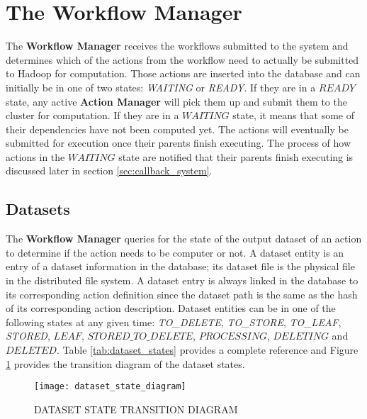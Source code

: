 \section{The Workflow Manager}
The \textbf{Workflow Manager} receives the workflows submitted to the system and determines which of the actions from the workflow need to actually be submitted to Hadoop for computation. Those actions are inserted into the database and can initially be in one of two states: \textit{WAITING} or \textit{READY}. If they are in a $READY$ state, any active \textbf{Action Manager} will pick them up and submit them to the cluster for computation. If they are in a $WAITING$ state, it means that some of their dependencies have not been computed yet. The actions will eventually be submitted for execution once their parents finish executing. The process of how actions in the $WAITING$ state are notified that their parents finish executing is discussed later in section \ref{sec:callback_system}.

\subsection{Datasets}
The \textbf{Workflow Manager} queries for the state of the output dataset of an action to determine if the action needs to be computer or not.  A dataset entity is an entry of a dataset information in the database; its dataset file is the physical file in the distributed file system. A dataset entry is always linked in the database to its corresponding action definition since the dataset path is the same as the hash of its corresponding action description. Dataset entities can be in one of the following states at any given time: \textit{TO\_DELETE}, \textit{TO\_STORE}, \textit{TO\_LEAF}, \textit{STORED}, $LEAF$, $STORED\_TO\_DELETE$, $PROCESSING$, $DELETING$ and $DELETED$. Table \ref{tab:dataset_states} provides a complete reference and Figure \ref{fig:dataset_transition_diagram} provides the transition diagram of the dataset states.


\begin{figure}
\centering
\texttt{[image: dataset\_state\_diagram]}
\caption{DATASET STATE TRANSITION DIAGRAM}
\label{fig:dataset_transition_diagram}
\end{figure}

